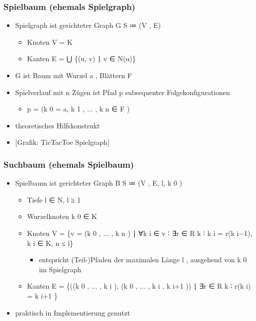\documentclass[]{article}
\begin{document}
\hypertarget{header-n305}{%
\subsubsection{Spielbaum (ehemals Spielgraph)}\label{header-n305}}

\begin{itemize}
\item
  Spielgraph ist gerichteter Graph G S ≔ (V , E)

  \begin{itemize}
  \item
    Knoten V = K
  \item
    Kanten E = ⋃ \{(u, v) ∣ v ∈ N(u)\}
  \end{itemize}
\item
  G ist Baum mit Wurzel a , Blättern F
\item
  Spielverlauf mit n Zügen ist Pfad p subsequenter Folgekonfigurationen

  \begin{itemize}
  \item
    p = (k 0 = a, k 1 , ... , k n ∈ F )
  \end{itemize}
\item
  theoretisches Hilfskonstrukt
\item
  {[}Grafik: TicTacToe Spielgraph{]}
\end{itemize}

\hypertarget{header-n382}{%
\subsubsection{Suchbaum (ehemals Spielbaum)}\label{header-n382}}

\begin{itemize}
\item
  Spielbaum ist gerichteter Graph B S ≔ (V , E, l, k 0 )

  \begin{itemize}
  \item
    Tiefe l ∈ N, l ≥ 1
  \item
    Wurzelknoten k 0 ∈ K
  \item
    Knoten V = \{v = (k 0 , ... , k n ) ∣ ∀k i ∈ v ∶ ∃r ∈ R k ∶ k i =
    r(k i−1), k i ∈ K, n ≤ l\}

    \begin{itemize}
    \item
      entspricht (Teil-)Pfaden der maximalen Länge l , ausgehend von k 0
      im Spielgraph
    \end{itemize}
  \item
    Kanten E = \{((k 0 , ... , k i ), (k 0 , ... , k i , k i+1 )) ∣ ∃r ∈
    R k ∶ r(k i) = k i+1 \}
  \end{itemize}
\item
  praktisch in Implementierung genutzt
\end{itemize}
\end{document}
